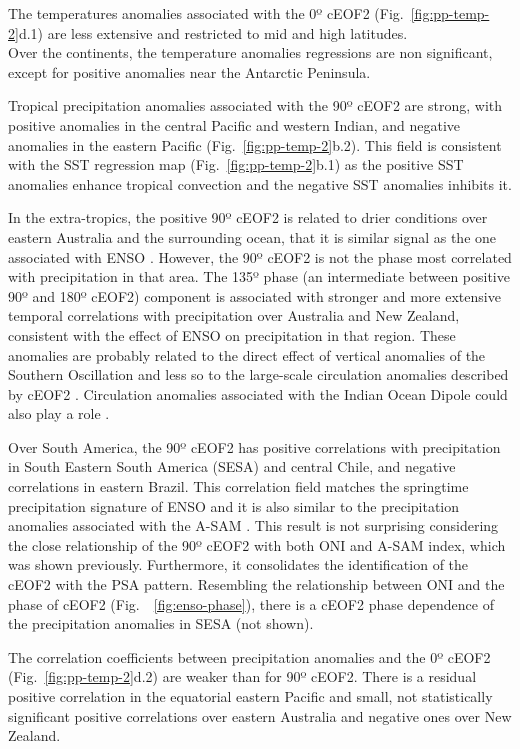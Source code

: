 \documentclass[pdflatex,lineno,sn-basic]{sn-jnl}
\theoremstyle{thmstyleone}%
\theoremstyle{thmstyletwo}%
\theoremstyle{thmstylethree}%
\begin{document}
The temperatures anomalies associated with the 0º cEOF2 (Fig.~\ref{fig:pp-temp-2}d.1) are less extensive and restricted to mid and high latitudes.\\
Over the continents, the temperature anomalies regressions are non significant, except for positive anomalies near the Antarctic Peninsula.

Tropical precipitation anomalies associated with the 90º cEOF2 are strong, with positive anomalies in the central Pacific and western Indian, and negative anomalies in the eastern Pacific (Fig.~\ref{fig:pp-temp-2}b.2).
This field is consistent with the SST regression map (Fig.~\ref{fig:pp-temp-2}b.1) as the positive SST anomalies enhance tropical convection and the negative SST anomalies inhibits it.

In the extra-tropics, the positive 90º cEOF2 is related to drier conditions over eastern Australia and the surrounding ocean, that it is similar signal as the one associated with ENSO \citep{cai2011}.
However, the 90º cEOF2 is not the phase most correlated with precipitation in that area.
The 135º phase (an intermediate between positive 90º and 180º cEOF2) component is associated with stronger and more extensive temporal correlations with precipitation over Australia and New Zealand, consistent with the effect of ENSO on precipitation in that region.
These anomalies are probably related to the direct effect of vertical anomalies of the Southern Oscillation and less so to the large-scale circulation anomalies described by cEOF2 \citep{cai2011b}.
Circulation anomalies associated with the Indian Ocean Dipole could also play a role \citep{cai2011b}.

Over South America, the 90º cEOF2 has positive correlations with precipitation in South Eastern South America (SESA) and central Chile, and negative correlations in eastern Brazil.
This correlation field matches the springtime precipitation signature of ENSO \citep[e.g.][]{cai2020a} and it is also similar to the precipitation anomalies associated with the A-SAM \citep{campitelli2022}.
This result is not surprising considering the close relationship of the 90º cEOF2 with both ONI and A-SAM index, which was shown previously.
Furthermore, it consolidates the identification of the cEOF2 with the PSA pattern. Resembling the relationship between ONI and the phase of cEOF2 (Fig.~~\ref{fig:enso-phase}), there is a cEOF2 phase dependence of the precipitation anomalies in SESA (not shown).

The correlation coefficients between precipitation anomalies and the 0º cEOF2 (Fig.~\ref{fig:pp-temp-2}d.2) are weaker than for 90º cEOF2.
There is a residual positive correlation in the equatorial eastern Pacific and small, not statistically significant positive correlations over eastern Australia and negative ones over New Zealand.
\end{document}
